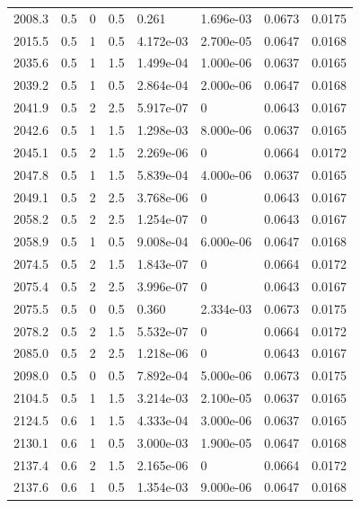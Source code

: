 \documentclass[preview]{standalone}
\begin{document}
{{{{{\begin{tabular}{L{1.2cm}C{1.2cm} C{0.3cm}C{0.5cm} C{1.4cm}C{1.4cm} C{1.4cm}C{1.4cm}}
  2008.3  &   0.5  & 0     & 0.5 &  0.261  & 1.696e-03  & 0.0673 &  0.0175   \\ 
  2015.5  &   0.5  & 1     & 0.5 &  4.172e-03  & 2.700e-05  & 0.0647 &  0.0168   \\ 
  2035.6  &   0.5  & 1     & 1.5 &  1.499e-04  & 1.000e-06  & 0.0637 &  0.0165   \\ 
  2039.2  &   0.5  & 1     & 0.5 &  2.864e-04  & 2.000e-06  & 0.0647 &  0.0168   \\ 
  2041.9  &   0.5  & 2     & 2.5 &  5.917e-07  & 0  & 0.0643 &  0.0167   \\ 
  2042.6  &   0.5  & 1     & 1.5 &  1.298e-03  & 8.000e-06  & 0.0637 &  0.0165   \\ 
  2045.1  &   0.5  & 2     & 1.5 &  2.269e-06  & 0  & 0.0664 &  0.0172   \\ 
  2047.8  &   0.5  & 1     & 1.5 &  5.839e-04  & 4.000e-06  & 0.0637 &  0.0165   \\ 
  2049.1  &   0.5  & 2     & 2.5 &  3.768e-06  & 0  & 0.0643 &  0.0167   \\ 
  2058.2  &   0.5  & 2     & 2.5 &  1.254e-07  & 0  & 0.0643 &  0.0167   \\ 
  2058.9  &   0.5  & 1     & 0.5 &  9.008e-04  & 6.000e-06  & 0.0647 &  0.0168   \\ 
  2074.5  &   0.5  & 2     & 1.5 &  1.843e-07  & 0  & 0.0664 &  0.0172   \\ 
  2075.4  &   0.5  & 2     & 2.5 &  3.996e-07  & 0  & 0.0643 &  0.0167   \\ 
  2075.5  &   0.5  & 0     & 0.5 &  0.360  & 2.334e-03  & 0.0673 &  0.0175   \\ 
  2078.2  &   0.5  & 2     & 1.5 &  5.532e-07  & 0  & 0.0664 &  0.0172   \\ 
  2085.0  &   0.5  & 2     & 2.5 &  1.218e-06  & 0  & 0.0643 &  0.0167   \\ 
  2098.0  &   0.5  & 0     & 0.5 &  7.892e-04  & 5.000e-06  & 0.0673 &  0.0175   \\ 
  2104.5  &   0.5  & 1     & 1.5 &  3.214e-03  & 2.100e-05  & 0.0637 &  0.0165   \\ 
  2124.5  &   0.6  & 1     & 1.5 &  4.333e-04  & 3.000e-06  & 0.0637 &  0.0165   \\ 
  2130.1  &   0.6  & 1     & 0.5 &  3.000e-03  & 1.900e-05  & 0.0647 &  0.0168   \\ 
  2137.4  &   0.6  & 2     & 1.5 &  2.165e-06  & 0  & 0.0664 &  0.0172   \\ 
  2137.6  &   0.6  & 1     & 0.5 &  1.354e-03  & 9.000e-06  & 0.0647 &  0.0168   \\ 

\end{tabular}}}}}}
\end{document}
